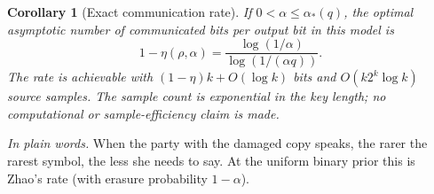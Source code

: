 \documentclass[11pt,a4paper]{article}
\numberwithin{equation}{section}
\newtheorem{corollary}[theorem]{Corollary}
\theoremstyle{definition}
\theoremstyle{remark}
\newcommand{\ac}{\alpha_*}
\newcommand{\plain}[1]{\par\smallskip\noindent\textit{In plain words.} #1\par\smallskip}
\begin{document}
\begin{corollary}[Exact communication rate]\label{cor:agreement}
If \(0<\alpha\le\ac(q)\), the optimal asymptotic number of communicated bits
per output bit in this model is
\begin{equation}\label{eq:communication}
1-\eta(\rho,\alpha)
=\frac{\log(1/\alpha)}{\log(1/(\alpha q))}.
\end{equation}
The rate is achievable with \((1-\eta)k+O(\log k)\) bits and
\(O(k2^k\log k)\) source samples. The sample count is exponential in the
key length; no computational or sample-efficiency claim is made.
\end{corollary}
\plain{When the party with the damaged copy speaks, the rarer the rarest
symbol, the less she needs to say. At the uniform binary prior this is
Zhao's rate \cite[Corollary~3.1.3]{zhao} (with erasure probability
\(1-\alpha\)).}
\end{document}
